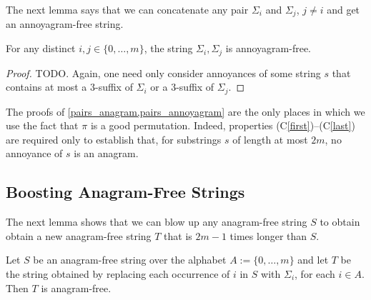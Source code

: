 \documentclass[kpfonts]{patmorin}
\newcommand{\condref}[1]{(C\ref{#1})}
\begin{document}
The next lemma says that we can concatenate any pair $\Sigma_i$ and $\Sigma_j$, $j\neq i$ and get an annoyagram-free string.

\begin{lem}\label{pairs_annoyagram}
    For any distinct $i,j\in\{0,\ldots,m\}$, the string $\Sigma_i,\Sigma_j$ is annoyagram-free.
\end{lem}

\begin{proof}
    TODO.  Again, one need only consider annoyances of some string $s$ that contains at most a $3$-suffix of $\Sigma_i$ or a $3$-suffix of $\Sigma_j$.
\end{proof}

The proofs of \cref{pairs_anagram,pairs_annoyagram} are the only places in which we use the fact that $\pi$ is a good permutation.  Indeed, properties \condref{first}--\condref{last} are required only to establish that, for substrings $s$ of length at most $2m$, no annoyance of $s$ is an anagram.

\subsection{Boosting Anagram-Free Strings}

The next lemma shows that we can blow up any anagram-free string $S$ to obtain obtain a new anagram-free string $T$ that is $2m-1$ times longer than $S$.

\begin{lem}\label{blow_up_af}
    Let $S$ be an anagram-free string over the alphabet $A:=\{0,\ldots,m\}$ and let $T$ be the string obtained by replacing each occurrence of $i$ in $S$ with $\Sigma_i$, for each $i\in A$.  Then $T$ is anagram-free.
\end{lem}
\end{document}
